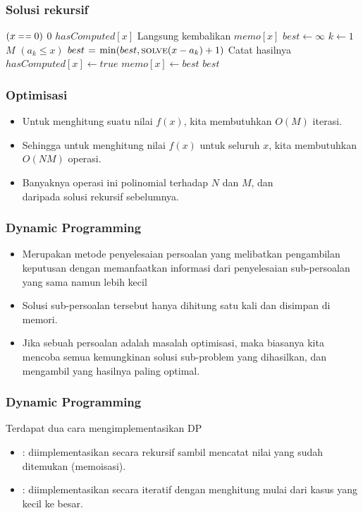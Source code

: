 \begin{frame}
\frametitle{Solusi rekursif}
\begin{codebox}
\li \If $(x \isequal 0)$ \Then
\li   \Return $0$
\li \ElseIf $hasComputed[x]$ \Then
\li   \Comment Langsung kembalikan
\li   \Return $memo[x]$ 
\li \Else
\li   $best \gets \infty$
\li   \For $k \gets 1$ \To $M$ \Do
\li     \If $(a_k \leq x)$ \Then
\li       $best \mathrel{\hspace{1pt}=\hspace{1pt}} \min(best, \textnormal{\scshape solve}(x - a_k) + 1)$
        \End
      \End
\li   \Comment Catat hasilnya      
\li   $hasComputed[x] \gets true$
\li   $memo[x] \gets best$
\li   \Return $best$
    \End
\end{codebox}
\end{frame}

\begin{frame}
\frametitle{Optimisasi}
\begin{itemize}
  \item Untuk menghitung suatu nilai $f(x)$, kita membutuhkan $O(M)$ iterasi.
  \item Sehingga untuk menghitung nilai $f(x)$ untuk seluruh $x$, kita membutuhkan $O(NM)$ operasi.
  \item Banyaknya operasi ini polinomial terhadap $N$ dan $M$, dan \\  daripada solusi rekursif sebelumnya.
\end{itemize}
\end{frame}

\begin{frame} 
\frametitle{Dynamic Programming}
\begin{itemize}
  \item Merupakan metode penyelesaian persoalan yang melibatkan pengambilan keputusan dengan memanfaatkan informasi dari penyelesaian sub-persoalan yang sama namun lebih kecil
  \item Solusi sub-persoalan tersebut hanya dihitung satu kali dan disimpan di memori.
  \item Jika sebuah persoalan adalah masalah optimisasi, maka biasanya kita mencoba semua kemungkinan solusi sub-problem yang dihasilkan, dan  mengambil yang hasilnya paling optimal. 
\end{itemize}
\end{frame}

\begin{frame} 
\frametitle{Dynamic Programming}
Terdapat dua cara mengimplementasikan DP
\begin{itemize}
  \item \newTerm{\fTopdown}: diimplementasikan secara rekursif sambil mencatat nilai yang sudah ditemukan (memoisasi).
  \item \newTerm{\fBottomup}: diimplementasikan secara iteratif dengan menghitung mulai dari kasus yang kecil ke besar.
  \newline
\end{itemize}
\end{frame}

